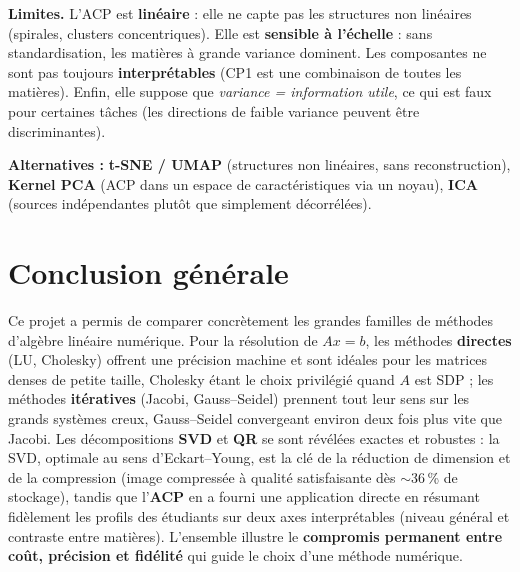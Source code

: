 \documentclass[11pt,a4paper]{article}
\begin{document}
\noindent\textbf{Limites.} L'ACP est \textbf{linéaire} : elle ne capte pas les structures non
linéaires (spirales, clusters concentriques). Elle est \textbf{sensible à l'échelle} : sans
standardisation, les matières à grande variance dominent. Les composantes ne sont pas toujours
\textbf{interprétables} (CP1 est une combinaison de toutes les matières). Enfin, elle suppose que
\emph{variance = information utile}, ce qui est faux pour certaines tâches (les directions de
faible variance peuvent être discriminantes).

\noindent\textbf{Alternatives :} \textbf{t-SNE / UMAP} (structures non linéaires, sans
reconstruction), \textbf{Kernel PCA} (ACP dans un espace de caractéristiques via un noyau),
\textbf{ICA} (sources indépendantes plutôt que simplement décorrélées).

\section{Conclusion générale}
Ce projet a permis de comparer concrètement les grandes familles de méthodes d'algèbre linéaire
numérique. Pour la résolution de $Ax=b$, les méthodes \textbf{directes} (LU, Cholesky) offrent une
précision machine et sont idéales pour les matrices denses de petite taille, Cholesky étant le
choix privilégié quand $A$ est SDP ; les méthodes \textbf{itératives} (Jacobi, Gauss--Seidel)
prennent tout leur sens sur les grands systèmes creux, Gauss--Seidel convergeant environ deux fois
plus vite que Jacobi. Les décompositions \textbf{SVD} et \textbf{QR} se sont révélées exactes et
robustes : la SVD, optimale au sens d'Eckart--Young, est la clé de la réduction de dimension et de
la compression (image compressée à qualité satisfaisante dès $\sim$36\,\% de stockage), tandis que
l'\textbf{ACP} en a fourni une application directe en résumant fidèlement les profils des étudiants
sur deux axes interprétables (niveau général et contraste entre matières). L'ensemble illustre le
\textbf{compromis permanent entre coût, précision et fidélité} qui guide le choix d'une méthode
numérique.
\end{document}
